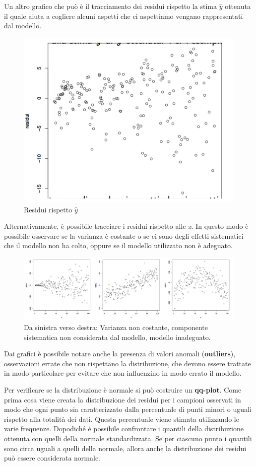 Un altro grafico che può è il tracciamento dei residui rispetto la stima $ \hat{y} $ ottenuta il quale aiuta a cogliere alcuni aspetti che ci aspettiamo vengano rappresentati dal modello.

\begin{figure}[htbp]
\centering
\includegraphics[width=.6\textwidth]{./notes/immagini/l6-fig12-1.png}
\caption{Residui rispetto $ \hat{y} $}
\end{figure}

Alternativamente, è possibile tracciare i residui rispetto alle \textit{x}. In questo modo è possibile osservare se la varianza è costante o se ci sono degli effetti sistematici che il modello non ha colto, oppure se il modello utilizzato non è adeguato.

\begin{figure}[htbp]
	\centering
	\includegraphics[width=\textwidth]{./notes/immagini/l6-fig13-1.png}
	\caption{Da sinistra verso destra: Varianza non costante, componente sistematica non considerata dal modello, modello inadeguato.}
\end{figure}


Dai grafici è possibile notare anche la presenza di valori anomali (\textbf{outliers}), osservazioni errate che non rispettano la distribuzione, che devono essere trattate in modo particolare per evitare che non influenzino in modo errato il modello.

Per verificare se la distribuzione è normale si può costruire un \textbf{qq-plot}.
Come prima cosa viene creata la distribuzione dei residui per i campioni osservati in modo che ogni punto sia caratterizzato dalla percentuale di punti minori o uguali rispetto alla totalità dei dati. Questa percentuale viene stimata utilizzando le varie frequenze.
Dopodiché è possibile confrontare i quantili della distribuzione ottenuta con quelli della normale standardizzata. Se per ciascuno punto i quantili sono circa uguali a quelli della normale, allora anche la distribuzione dei residui può essere considerata normale.

